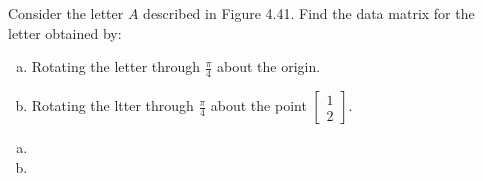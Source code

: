 \documentclass[../main.tex]{subfiles}
\begin{document}
Consider the letter $A$ described in Figure 4.41.
Find the data matrix for the letter obtained by:
\begin{enumerate}[a)]
	\item Rotating the letter through \(\frac{\pi}{4}\) about the origin.
	\item Rotating the ltter through \(\frac{\pi}{4}\) about the point \(\begin{bmatrix}1\\2\end{bmatrix}\).
\end{enumerate}

\solution
\begin{enumerate}[a)]
	\item 
	\item 
\end{enumerate}
\end{document}
